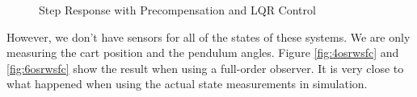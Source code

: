 \documentclass{article}
\begin{document}
\begin{figure}
\centering
{}
\caption{Step Response with Precompensation and LQR Control}
\end{figure}

However, we don't have sensors for all of the states of these systems. We are only measuring the cart position and the pendulum angles. Figure \ref{fig:4osrwsfc} and \ref{fig:6osrwsfc} show the result when using a full-order observer. It is very close to what happened when using the actual state measurements in simulation.
\end{document}
